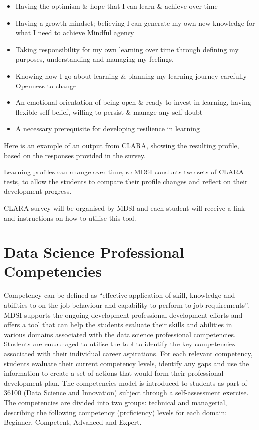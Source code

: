 \documentclass[]{book}
\providecommand{\tightlist}{%
  \setlength{\itemsep}{0pt}\setlength{\parskip}{0pt}}
\theoremstyle{definition}
\theoremstyle{definition}
\theoremstyle{remark}
\begin{document}
\begin{itemize}
\tightlist
\item
  Having the optimism \& hope that I can learn \& achieve over time
\item
  Having a growth mindset; believing I can generate my own new knowledge
  for what I need to achieve Mindful agency
\item
  Taking responsibility for my own learning over time through defining
  my purposes, understanding and managing my feelings,
\item
  Knowing how I go about learning \& planning my learning journey
  carefully Openness to change
\item
  An emotional orientation of being open \& ready to invest in learning,
  having flexible self-belief, willing to persist \& manage any
  self-doubt
\item
  A necessary prerequisite for developing resilience in learning
\end{itemize}

Here is an example of an output from CLARA, showing the resulting
profile, based on the responses provided in the survey.

Learning profiles can change over time, so MDSI conducts two sets of
CLARA tests, to allow the students to compare their profile changes and
reflect on their development progress.

CLARA survey will be organised by MDSI and each student will receive a
link and instructions on how to utilise this tool.

\section{Data Science Professional
Competencies}\label{data-science-professional-competencies}

Competency can be defined as ``effective application of skill, knowledge
and abilities to on-the-job-behaviour and capability to perform to job
requirements''. MDSI supports the ongoing development professional
development efforts and offers a tool that can help the students
evaluate their skills and abilities in various domains associated with
the data science professional competencies. Students are encouraged to
utilise the tool to identify the key competencies associated with their
individual career aspirations. For each relevant competency, students
evaluate their current competency levels, identify any gaps and use the
information to create a set of actions that would form their
professional development plan. The competencies model is introduced to
students as part of 36100 (Data Science and Innovation) subject through
a self-assessment exercise. The competencies are divided into two
groups: technical and managerial, describing the following competency
(proficiency) levels for each domain: Beginner, Competent, Advanced and
Expert.
\end{document}
